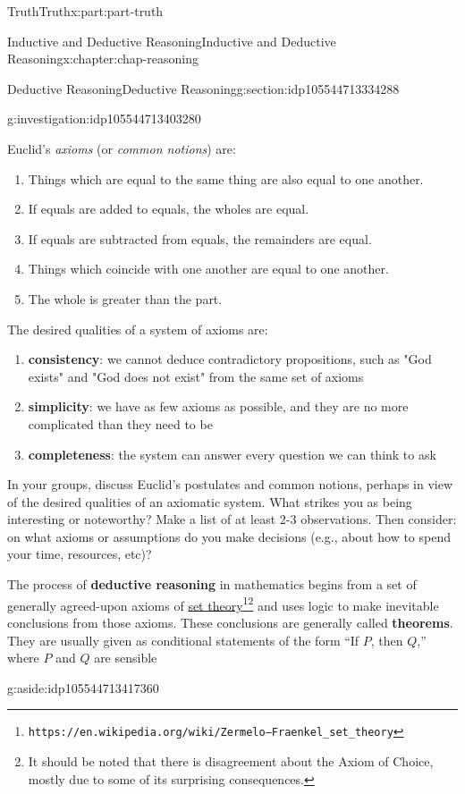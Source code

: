\documentclass[oneside,10pt,]{book}
\newcommand{\terminology}[1]{\textbf{#1}}
\numberwithin{equation}{section}
\begin{document}
\begin{partptx}{Truth}{}{Truth}{}{}{x:part:part-truth}
\begin{chapterptx}{Inductive and Deductive Reasoning}{}{Inductive and Deductive Reasoning}{}{}{x:chapter:chap-reasoning}
\begin{sectionptx}{Deductive Reasoning}{}{Deductive Reasoning}{}{}{g:section:idp105544713334288}
\begin{investigation}{}{g:investigation:idp105544713403280}
\begin{enumerate}
\end{enumerate}
Euclid's \emph{axioms} (or \emph{common notions}) are:%
%
\begin{enumerate}
\item{}Things which are equal to the same thing are also equal to one another.%
\item{}If equals are added to equals, the wholes are equal.%
\item{}If equals are subtracted from equals, the remainders are equal.%
\item{}Things which coincide with one another are equal to one another.%
\item{}The whole is greater than the part.%
\end{enumerate}
The desired qualities of a system of axioms are:%
%
\begin{enumerate}
\item{}\terminology{consistency}: we cannot deduce contradictory propositions, such as "God exists" and "God does not exist" from the same set of axioms%
\item{}\terminology{simplicity}: we have as few axioms as possible, and they are no more complicated than they need to be%
\item{}\terminology{completeness}: the system can answer every question we can think to ask%
\end{enumerate}
In your groups, discuss Euclid's postulates and common notions, perhaps in view of the desired qualities of an axiomatic system. What strikes you as being interesting or noteworthy? Make a list of at least 2-3 observations. Then consider: on what axioms or assumptions do you make decisions (e.g., about how to spend your time, resources, etc)?%
\end{investigation}%
%
The process of \terminology{deductive reasoning} in mathematics begins from a set of generally agreed-upon axioms of \href{https://en.wikipedia.org/wiki/Zermelo–Fraenkel_set_theory}{set theory}\footnote{\nolinkurl{https://en.wikipedia.org/wiki/Zermelo–Fraenkel_set_theory}\label{g:fn:idp105544713414288}}\footnote{It should be noted that there is disagreement about the Axiom of Choice, mostly due to some of its surprising consequences.\label{g:fn:idp105544713414544}} and uses logic to make inevitable conclusions from those axioms. These conclusions are generally called \terminology{theorems}. They are usually given as conditional statements of the form ``If \(P\), then \(Q\),'' where \(P\) and \(Q\) are sensible\begin{aside}{}{g:aside:idp105544713417360}%

\end{aside}
\end{sectionptx}
\end{chapterptx}
\end{partptx}
\end{document}
